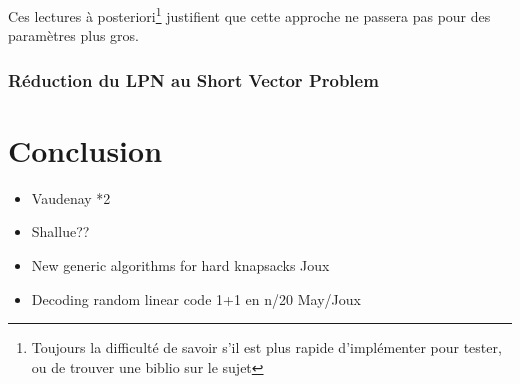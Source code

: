 \documentclass{article}		%
\begin{document}
Ces lectures à posteriori\footnote{Toujours la difficulté de savoir s'il
est plus rapide d'implémenter pour tester, ou de trouver une biblio sur
le sujet} justifient que cette approche ne passera pas pour
des paramètres plus gros. 

\subsubsection{Réduction du LPN au Short Vector Problem}


\section{Conclusion}

\begin{itemize}
\item Vaudenay *2
\item Shallue??
\item New generic algorithms for hard knapsacks Joux
\item Decoding random linear code 1+1 en n/20 May/Joux
\end{itemize}

\nocite{DBLP:conf/rfidsec/BernsteinL12}


\end{document}
